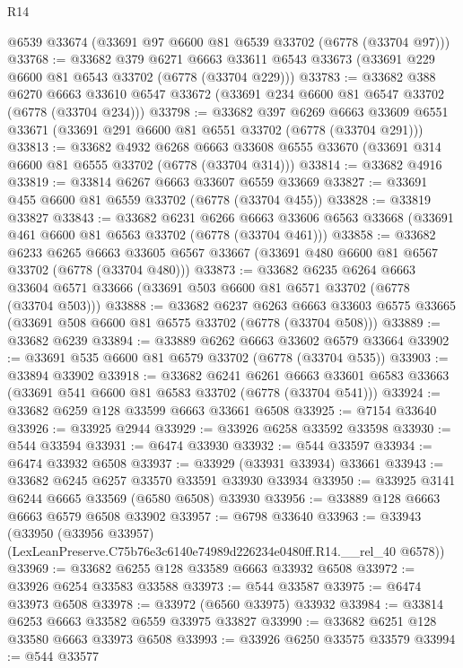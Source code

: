 \begin{lexlean}{R14}
\begin{coremodule}
    @6539
    @33674
    (@33691 @97 @6600 @81 @6539 @33702 (@6778 (@33704 @97)))
@33768 := @33682
    @379
    @6271
    @6663
    @33611
    @6543
    @33673
    (@33691 @229 @6600 @81 @6543 @33702 (@6778 (@33704 @229)))
@33783 := @33682
    @388
    @6270
    @6663
    @33610
    @6547
    @33672
    (@33691 @234 @6600 @81 @6547 @33702 (@6778 (@33704 @234)))
@33798 := @33682
    @397
    @6269
    @6663
    @33609
    @6551
    @33671
    (@33691 @291 @6600 @81 @6551 @33702 (@6778 (@33704 @291)))
@33813 := @33682
    @4932
    @6268
    @6663
    @33608
    @6555
    @33670
    (@33691 @314 @6600 @81 @6555 @33702 (@6778 (@33704 @314)))
@33814 := @33682 @4916
@33819 := @33814 @6267 @6663 @33607 @6559 @33669
@33827 := @33691 @455 @6600 @81 @6559 @33702 (@6778 (@33704 @455))
@33828 := @33819 @33827
@33843 := @33682
    @6231
    @6266
    @6663
    @33606
    @6563
    @33668
    (@33691 @461 @6600 @81 @6563 @33702 (@6778 (@33704 @461)))
@33858 := @33682
    @6233
    @6265
    @6663
    @33605
    @6567
    @33667
    (@33691 @480 @6600 @81 @6567 @33702 (@6778 (@33704 @480)))
@33873 := @33682
    @6235
    @6264
    @6663
    @33604
    @6571
    @33666
    (@33691 @503 @6600 @81 @6571 @33702 (@6778 (@33704 @503)))
@33888 := @33682
    @6237
    @6263
    @6663
    @33603
    @6575
    @33665
    (@33691 @508 @6600 @81 @6575 @33702 (@6778 (@33704 @508)))
@33889 := @33682 @6239
@33894 := @33889 @6262 @6663 @33602 @6579 @33664
@33902 := @33691 @535 @6600 @81 @6579 @33702 (@6778 (@33704 @535))
@33903 := @33894 @33902
@33918 := @33682
    @6241
    @6261
    @6663
    @33601
    @6583
    @33663
    (@33691 @541 @6600 @81 @6583 @33702 (@6778 (@33704 @541)))
@33924 := @33682 @6259 @128 @33599 @6663 @33661 @6508
@33925 := @7154 @33640
@33926 := @33925 @2944
@33929 := @33926 @6258 @33592 @33598
@33930 := @544 @33594
@33931 := @6474 @33930
@33932 := @544 @33597
@33934 := @6474 @33932 @6508
@33937 := @33929 (@33931 @33934) @33661
@33943 := @33682 @6245 @6257 @33570 @33591 @33930 @33934
@33950 := @33925 @3141 @6244 @6665 @33569 (@6580 @6508) @33930
@33956 := @33889 @128 @6663 @6663 @6579 @6508 @33902
@33957 := @6798 @33640
@33963 := @33943
    (@33950 (@33956 @33957) (LexLeanPreserve.C75b76e3c6140e74989d226234e0480ff.R14.__rel_40 @6578))
@33969 := @33682 @6255 @128 @33589 @6663 @33932 @6508
@33972 := @33926 @6254 @33583 @33588
@33973 := @544 @33587
@33975 := @6474 @33973 @6508
@33978 := @33972 (@6560 @33975) @33932
@33984 := @33814 @6253 @6663 @33582 @6559 @33975 @33827
@33990 := @33682 @6251 @128 @33580 @6663 @33973 @6508
@33993 := @33926 @6250 @33575 @33579
@33994 := @544 @33577

\end{coremodule}
\end{lexlean}
